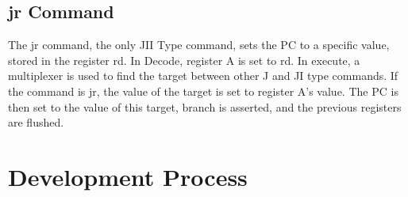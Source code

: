 \documentclass[letterpaper]{article} %
\begin{document}
\subsection*{jr Command}
The jr command, the only JII Type command, sets the PC to a specific value, stored in the register rd. In Decode, register A is set to rd. In execute, a multiplexer is used to find the target between other J and JI type commands. If the command is jr, the value of the target is set to register A's value. The PC is then set to the value of this target, branch is asserted, and the previous registers are flushed.

\section*{Development Process}
\end{document}
